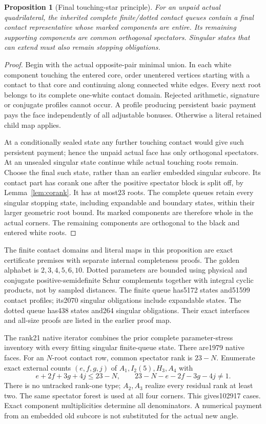 \documentclass[11pt]{article}
\newtheorem{proposition}[theorem]{Proposition}
\begin{document}
\begin{proposition}[Final touching-star principle]\label{prop:coverage}
For an unpaid actual quadrilateral, the inherited complete finite/dotted
contact queues contain a final contact representative whose marked
components are entire. Its remaining supporting components are common
orthogonal spectators. Singular states that can extend must also remain
stopping obligations.
\end{proposition}
\begin{proof}
Begin with the actual opposite-pair minimal union. In each white
component touching the entered core, order unentered vertices starting
with a contact to that core and continuing along connected white edges.
Every next root belongs to its complete one-white contact domain.
Rejected arithmetic, signature or conjugate profiles cannot occur.
A profile producing persistent basic payment pays the face independently
of all adjustable bonuses. Otherwise a literal retained child map applies.

At a conditionally sealed state any further touching contact would give
such persistent payment; hence the unpaid actual face has only orthogonal
spectators. At an unsealed singular state continue while actual touching
roots remain. Choose the final such state, rather than an earlier
embedded singular subcore. Its contact part has corank one after the
positive spectator block is split off, by Lemma~\ref{lem:corank}. It has
at most23 roots. The complete queues retain every singular stopping
state, including expandable and boundary states, within their larger
geometric root bound. Its marked components are therefore whole in the
actual corners. The remaining components are orthogonal to the black
and entered white roots.
\end{proof}
The finite contact domains and literal maps in this proposition are exact
certificate premises with separate internal completeness proofs. The
golden alphabet is $2,3,4,5,6,10$. Dotted parameters are bounded using
physical and conjugate positive-semidefinite Schur complements together
with integral cyclic products, not by sampled distances. The finite
queue has5172 states and51599 contact profiles; its2070 singular
obligations include expandable states. The dotted queue has438 states
and264 singular obligations. Their exact interfaces and all-size proofs
are listed in the earlier proof map.

The rank21 native iterator combines the prior complete parameter-stress
inventory with every fitting singular finite-queue state. There are1979
native faces. For an $N$-root contact row, common spectator rank is
$23-N$. Enumerate exact external counts $(e,f,g,j)$ of
$A_1,I_2(5),H_3,A_4$ with
\[
 e+2f+3g+4j\le23-N,\qquad
 23-N-e-2f-3g-4j\ne1.
\]
There is no untracked rank-one type; $A_2,A_3$ realize every residual
rank at least two. The same spectator forest is used at all four
corners. This gives102917 cases. Exact component multiplicities determine
all denominators. A numerical payment from an embedded old subcore is
not substituted for the actual new angle.
\end{document}

